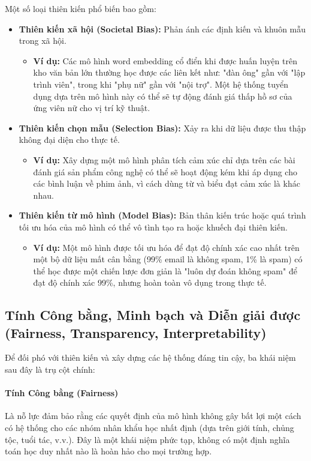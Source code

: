 Một số loại thiên kiến phổ biến bao gồm:
\begin{itemize}
    \item \textbf{Thiên kiến xã hội (Societal Bias):} Phản ánh các định kiến và khuôn mẫu trong xã hội.
        \begin{itemize}
            \item \textbf{Ví dụ:} Các mô hình word embedding cổ điển khi được huấn luyện trên kho văn bản lớn thường học được các liên kết như: "đàn ông" gần với "lập trình viên", trong khi "phụ nữ" gần với "nội trợ". Một hệ thống tuyển dụng dựa trên mô hình này có thể sẽ tự động đánh giá thấp hồ sơ của ứng viên nữ cho vị trí kỹ thuật.
        \end{itemize}
    \item \textbf{Thiên kiến chọn mẫu (Selection Bias):} Xảy ra khi dữ liệu được thu thập không đại diện cho thực tế.
        \begin{itemize}
            \item \textbf{Ví dụ:} Xây dựng một mô hình phân tích cảm xúc chỉ dựa trên các bài đánh giá sản phẩm công nghệ có thể sẽ hoạt động kém khi áp dụng cho các bình luận về phim ảnh, vì cách dùng từ và biểu đạt cảm xúc là khác nhau.
        \end{itemize}
    \item \textbf{Thiên kiến từ mô hình (Model Bias):} Bản thân kiến trúc hoặc quá trình tối ưu hóa của mô hình có thể vô tình tạo ra hoặc khuếch đại thiên kiến.
        \begin{itemize}
            \item \textbf{Ví dụ:} Một mô hình được tối ưu hóa để đạt độ chính xác cao nhất trên một bộ dữ liệu mất cân bằng (99\% email là không spam, 1\% là spam) có thể học được một chiến lược đơn giản là "luôn dự đoán không spam" để đạt độ chính xác 99\%, nhưng hoàn toàn vô dụng trong thực tế.
        \end{itemize}
\end{itemize}

\subsection{Tính Công bằng, Minh bạch và Diễn giải được (Fairness, Transparency, Interpretability)}
\label{ssec:fairness_transparency_interpretability}

Để đối phó với thiên kiến và xây dựng các hệ thống đáng tin cậy, ba khái niệm sau đây là trụ cột chính:

\paragraph{Tính Công bằng (Fairness)}
Là nỗ lực đảm bảo rằng các quyết định của mô hình không gây bất lợi một cách có hệ thống cho các nhóm nhân khẩu học nhất định (dựa trên giới tính, chủng tộc, tuổi tác, v.v.). Đây là một khái niệm phức tạp, không có một định nghĩa toán học duy nhất nào là hoàn hảo cho mọi trường hợp.

